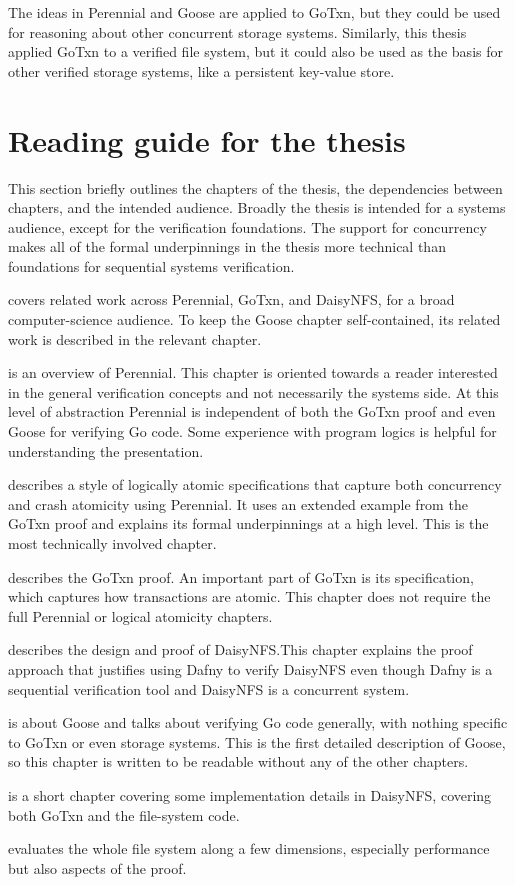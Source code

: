 The ideas in Perennial and Goose are applied to GoTxn, but they could be used
for reasoning about other concurrent storage systems. Similarly,
this thesis applied GoTxn to a verified file system, but it could also be used
as the basis for other verified storage systems, like a persistent key-value
store.


\section{Reading guide for the thesis}
\label{sec:intro:reading-guide}

This section briefly outlines the chapters of the thesis, the dependencies
between chapters, and the intended audience. Broadly the thesis is intended for
a systems audience, except for the verification foundations. The support for
concurrency makes all of the formal underpinnings in the thesis more technical
than foundations for sequential systems verification.

 covers related work across Perennial, GoTxn, and DaisyNFS, for
a broad computer-science audience. To keep the Goose chapter self-contained, its
related work is described in the relevant chapter.

 is an overview of Perennial. This chapter is oriented
towards a reader interested in the general verification concepts and not
necessarily the systems side. At this level of abstraction Perennial is
independent of both the GoTxn proof and even Goose for verifying Go code. Some
experience with program logics is helpful for understanding the presentation.

 describes a style of logically atomic specifications
that capture both concurrency and crash atomicity using Perennial. It uses an
extended example from the GoTxn proof and explains its formal underpinnings at a
high level. This is the most technically involved chapter.

 describes the GoTxn proof. An important part of GoTxn is its
specification, which captures how transactions are atomic. This chapter does not
require the full Perennial or logical atomicity chapters.

 describes the design and proof of DaisyNFS.\@ This chapter
explains the proof approach that justifies using Dafny to verify DaisyNFS even
though Dafny is a sequential verification tool and DaisyNFS is a concurrent
system.

 is about Goose and talks about verifying Go code generally, with
nothing specific to GoTxn or even storage systems. This is the first detailed
description of Goose, so this chapter is written to be readable without any of
the other chapters.

 is a short chapter covering some implementation details in
DaisyNFS, covering both GoTxn and the file-system code.

 evaluates the whole file system along a few dimensions,
especially performance but also aspects of the proof.
